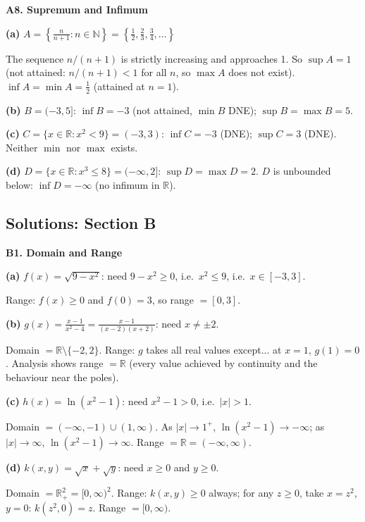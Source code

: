 \documentclass[12pt, a4paper]{article}
\theoremstyle{definition}
\newcommand{\R}{\mathbb{R}}
\newcommand{\N}{\mathbb{N}}
\begin{document}
\begin{solbox}
\textbf{A8. Supremum and Infimum}

\textbf{(a)} $A=\left\{\frac{n}{n+1}:n\in\N\right\} = \left\{\frac{1}{2},\frac{2}{3},\frac{3}{4},\ldots\right\}$

The sequence $n/(n+1)$ is strictly increasing and approaches 1. So $\sup A = 1$ (not attained: $n/(n+1)<1$ for all $n$, so $\max A$ does not exist). $\inf A = \min A = \frac{1}{2}$ (attained at $n=1$).

\textbf{(b)} $B=(-3,5]$: $\inf B = -3$ (not attained, $\min B$ DNE); $\sup B = \max B = 5$.

\textbf{(c)} $C=\{x\in\R:x^2<9\} = (-3,3)$: $\inf C = -3$ (DNE); $\sup C = 3$ (DNE). Neither $\min$ nor $\max$ exists.

\textbf{(d)} $D=\{x\in\R:x^3\leq 8\} = (-\infty,2]$: $\sup D = \max D = 2$. $D$ is unbounded below: $\inf D = -\infty$ (no infimum in $\R$).
\end{solbox}

\subsection{Solutions: Section B}

\begin{solbox}
\textbf{B1. Domain and Range}

\textbf{(a)} $f(x)=\sqrt{9-x^2}$: need $9-x^2\geq 0$, i.e.\ $x^2\leq 9$, i.e.\ $x\in[-3,3]$.

Range: $f(x)\geq 0$ and $f(0)=3$, so range $=[0,3]$.

\textbf{(b)} $g(x)=\frac{x-1}{x^2-4}=\frac{x-1}{(x-2)(x+2)}$: need $x\neq\pm 2$.

Domain $= \R\setminus\{-2,2\}$. Range: $g$ takes all real values except... at $x=1$, $g(1)=0$. Analysis shows range $=\R$ (every value achieved by continuity and the behaviour near the poles).

\textbf{(c)} $h(x)=\ln(x^2-1)$: need $x^2-1>0$, i.e.\ $|x|>1$.

Domain $=(-\infty,-1)\cup(1,\infty)$. As $|x|\to 1^+$, $\ln(x^2-1)\to-\infty$; as $|x|\to\infty$, $\ln(x^2-1)\to\infty$. Range $=\R=(-\infty,\infty)$.

\textbf{(d)} $k(x,y)=\sqrt{x}+\sqrt{y}$: need $x\geq 0$ and $y\geq 0$.

Domain $= \R^2_+ = [0,\infty)^2$. Range: $k(x,y)\geq 0$ always; for any $z\geq 0$, take $x=z^2$, $y=0$: $k(z^2,0)=z$. Range $=[0,\infty)$.
\end{solbox}
\end{document}
